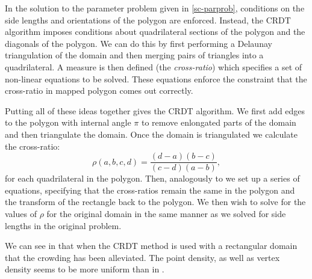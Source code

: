 In the solution to the \sch parameter problem given in \ref{sc-parprob}, conditions on the side lengths and orientations of the polygon are enforced. Instead, the CRDT algorithm imposes conditions about quadrilateral sections of the polygon and the diagonals of the polygon. We can do this by first performing a Delaunay triangulation of the domain and then merging pairs of triangles into a quadrilateral. A measure is then defined (the \emph{cross-ratio}) which specifies a set of non-linear equations to be solved. These equations enforce the constraint that the cross-ratio in mapped polygon comes out correctly. 

Putting all of these ideas together gives the CRDT algorithm. We first add edges to the polygon with internal angle $\pi$ to remove enlongated parts of the domain and then triangulate the domain. Once the domain is triangulated we calculate the cross-ratio:
\begin{equation}
\rho(a,b,c,d) = \frac{(d-a)(b-c)}{(c-d)(a-b)},
\end{equation}
for each quadrilateral in the polygon. Then, analogously to  we set up a series of equations, specifying that the cross-ratios remain the same in the polygon and the transform of the rectangle back to the polygon. We then wish to solve for the values of $\rho$ for the original domain in the same manner as we solved for side lengths in the original problem. 

We can see in  that when the CRDT method is used with a rectangular domain that the crowding has been alleviated. The point density, as well as vertex density seems to be more uniform than in .

